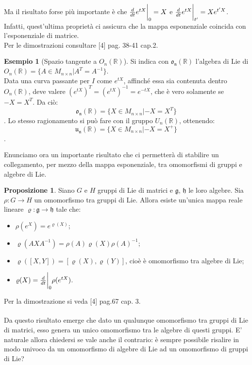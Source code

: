 \documentclass[12pt,a4paper]{report}
\theoremstyle{definition}
\newtheorem{Prop}[Def]{Proposizione}
\theoremstyle{definition}
\newtheorem{Ex}[Def]{Esempio}
\theoremstyle{definition}
\theoremstyle{remark}
\begin{document}
Ma il risultato forse più importante è che ${d\over dt}e^{tX}\bigg{\rvert}_0=X$ e ${d\over dt}e^{tX}\bigg{\rvert}_{t'}=Xe^{t'X}$.\\
Infatti, quest'ultima proprietà ci assicura che la mappa esponenziale coincida con l'esponenziale di matrice.\\
Per le dimostrazioni consultare [4] pag. 38-41 cap.2.\\
\begin{Ex}[Spazio tangente a $O_n(\mathbb{R})$]
	Si indica con $\mathfrak{o_n(\mathbb{R})}$ l'algebra di Lie di $O_n(\mathbb{R})=\{A\in M_{n\times n}|A^T=A^{-1}\}$.\\
	Data una curva passante per $I$ come $e^{tX}$, affinché essa sia contenuta dentro $O_n(\mathbb{R})$, deve valere $(e^{tX})^T=(e^{tX})^{-1}=e^{-tX}$, che è vero solamente se $-X=X^T$. Da ciò: $$\mathfrak{o_n(\mathbb{R})}=\{X\in M_{n\times n}|-X=X^T\}$$.
	Lo stesso ragionamento si può fare con il gruppo $U_n(\mathbb{R})$, ottenendo: $$\mathfrak{u_n(\mathbb{R})}=\{X\in M_{n\times n}|-X=X^+\}$$.
\end{Ex}
Enunciamo ora un importante risultato che ci permetterà di stabilire un collegamento, per mezzo della mappa esponenziale, tra omomorfismi di gruppi e algebre di Lie.
\begin{Prop}
	Siano $G$ e $H$ gruppi di Lie di matrici e $\mathfrak{g}$, $\mathfrak{h}$ le loro algebre. Sia $\rho:G\rightarrow H$ un omomorfismo tra gruppi di Lie. Allora esiste un'unica mappa reale lineare $\varrho:\mathfrak{g}\rightarrow\mathfrak{h}$ tale che:
	\begin{itemize}
		\item $\rho(e^X)=e^{\varrho(X)}$; 
		\item $\varrho(AXA^{-1})=\rho(A)\varrho(X)\rho(A)^{-1}$;
		\item $\varrho([X,Y])=[\varrho(X),\varrho(Y)]$, cioè è omomorfismo tra algebre di Lie;
		\item $\varrho(X)={d\over dt}\bigg{\rvert}_0\rho(e^{tX})$.
	\end{itemize}
\end{Prop}
Per la dimostrazione si veda [4] pag.67 cap. 3.\\
\\
Da questo risultato emerge che dato un qualunque omomorfismo tra gruppi di Lie di matrici, esso genera un unico omomorfismo tra le algebre di questi gruppi. E' naturale allora chiedersi se vale anche il contrario: è sempre possibile risalire in modo univoco da un omomorfismo di algebre di Lie ad un omomorfismo di gruppi di Lie?
\end{document}
